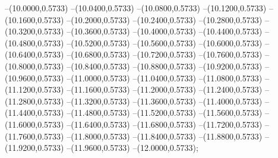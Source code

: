 {	--(10.0000,0.5733)
	--(10.0400,0.5733)
	--(10.0800,0.5733)
	--(10.1200,0.5733)
	--(10.1600,0.5733)
	--(10.2000,0.5733)
	--(10.2400,0.5733)
	--(10.2800,0.5733)
	--(10.3200,0.5733)
	--(10.3600,0.5733)
	--(10.4000,0.5733)
	--(10.4400,0.5733)
	--(10.4800,0.5733)
	--(10.5200,0.5733)
	--(10.5600,0.5733)
	--(10.6000,0.5733)
	--(10.6400,0.5733)
	--(10.6800,0.5733)
	--(10.7200,0.5733)
	--(10.7600,0.5733)
	--(10.8000,0.5733)
	--(10.8400,0.5733)
	--(10.8800,0.5733)
	--(10.9200,0.5733)
	--(10.9600,0.5733)
	--(11.0000,0.5733)
	--(11.0400,0.5733)
	--(11.0800,0.5733)
	--(11.1200,0.5733)
	--(11.1600,0.5733)
	--(11.2000,0.5733)
	--(11.2400,0.5733)
	--(11.2800,0.5733)
	--(11.3200,0.5733)
	--(11.3600,0.5733)
	--(11.4000,0.5733)
	--(11.4400,0.5733)
	--(11.4800,0.5733)
	--(11.5200,0.5733)
	--(11.5600,0.5733)
	--(11.6000,0.5733)
	--(11.6400,0.5733)
	--(11.6800,0.5733)
	--(11.7200,0.5733)
	--(11.7600,0.5733)
	--(11.8000,0.5733)
	--(11.8400,0.5733)
	--(11.8800,0.5733)
	--(11.9200,0.5733)
	--(11.9600,0.5733)
	--(12.0000,0.5733);
}
